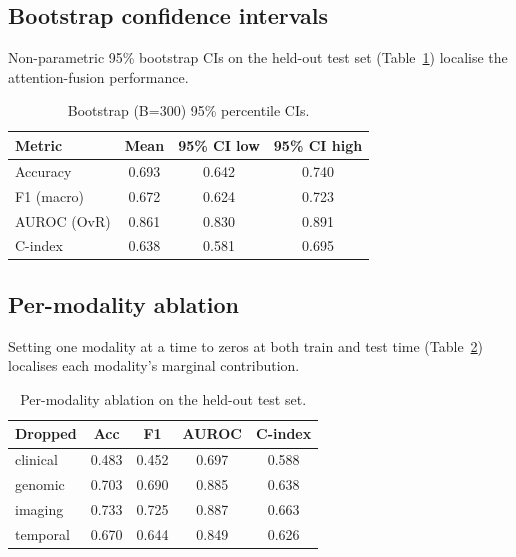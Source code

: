 \documentclass[11pt,a4paper]{article}
\begin{document}
\subsection{Bootstrap confidence intervals}
Non-parametric 95\% bootstrap CIs on the held-out test set (Table~\ref{tab:boot}) localise the attention-fusion performance.
\begin{table}[htbp]\centering
\caption{Bootstrap (B=300) 95\% percentile CIs.}\label{tab:boot}
\small
\begin{tabular}{lccc}
\toprule
Metric & Mean & 95\% CI low & 95\% CI high \\
\midrule
Accuracy & 0.693 & 0.642 & 0.740 \\
F1 (macro) & 0.672 & 0.624 & 0.723 \\
AUROC (OvR) & 0.861 & 0.830 & 0.891 \\
C-index & 0.638 & 0.581 & 0.695 \\
\bottomrule\end{tabular}\end{table}
\subsection{Per-modality ablation}
Setting one modality at a time to zeros at both train and test time (Table~\ref{tab:ablation}) localises each modality's marginal contribution.
\begin{table}[htbp]\centering
\caption{Per-modality ablation on the held-out test set.}\label{tab:ablation}
\small
\begin{tabular}{lcccc}
\toprule
Dropped & Acc & F1 & AUROC & C-index \\
\midrule
clinical & 0.483 & 0.452 & 0.697 & 0.588 \\
genomic & 0.703 & 0.690 & 0.885 & 0.638 \\
imaging & 0.733 & 0.725 & 0.887 & 0.663 \\
temporal & 0.670 & 0.644 & 0.849 & 0.626 \\
\bottomrule\end{tabular}\end{table}
\end{document}
